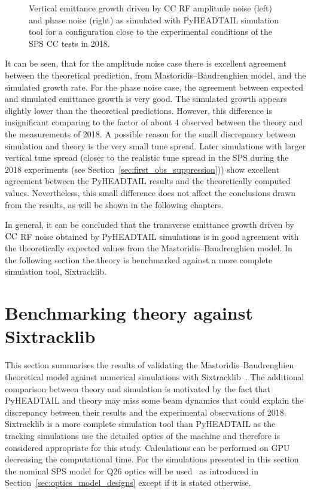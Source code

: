 \begin{figure}[htp]
\begin{subfigure}{.45\textwidth}
    \end{subfigure}
    \caption{Vertical emittance growth driven by CC RF amplitude noise (left) and phase noise (right) as simulated with PyHEADTAIL simulation tool for a configuration close to the experimental conditions of the SPS CC tests in 2018.}
    \label{fig:study_pyheadtail_normalised_momentum_kicks}
\end{figure}

It can be seen, that for the amplitude noise case there is excellent agreement between the theoretical prediction, from Mastoridis--Baudrenghien model, and the simulated growth rate. For the phase noise case, the agreement between expected and simulated emittance growth is very good. The simulated growth appears slightly lower than the theoretical predictions. However, this difference is insignificant comparing to the factor of about 4 observed between the theory and the measurements of 2018. A possible reason for the small discrepancy between simulation and theory is the very small tune spread. Later simulations with larger vertical tune spread (closer to the realistic tune spread in the SPS during the 2018 experiments (see Section~\ref{sec:first_obs_suppression})) show excellent agreement between the PyHEADTAIL results and the theoretically computed values. Nevertheless, this small difference does not affect the conclusions drawn from the results, as will be shown in the following chapters.

In general, it can be concluded that the transverse emittance growth driven by ${\mathrm{CC}}$ RF noise obtained by PyHEADTAIL simulations is in good agreement with the theoretically expected values from the Mastoridis--Baudrenghien model. In the following section the theory is benchmarked against a more complete simulation tool, Sixtracklib.


\section{Benchmarking theory against Sixtracklib}\label{sec:benchmark_theory_with_sixtracklib}
This section summarises the results of validating the Mastoridis--Baudrenghien theoretical model against numerical simulations with Sixtracklib~\cite{sixtracklib_repo}. The additional comparison between theory and simulation is motivated by the fact that PyHEADTAIL and theory may miss some beam dynamics that could explain the discrepancy between their results and the experimental observations of 2018. Sixtracklib is a more complete simulation tool than PyHEADTAIL as the tracking simulations use the detailed optics of the machine and therefore is considered appropriate for this study. Calculations can be performed on GPU decreasing the computational time. For the simulations presented in this section the nominal SPS model for Q26 optics will be used~\cite{cern_optics_repo} as introduced in Section~\ref{sec:optics_model_designs} except if it is stated otherwise.

